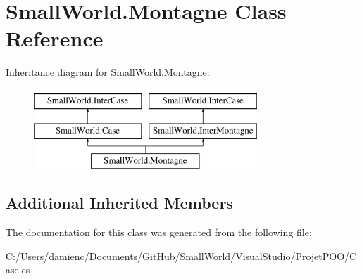 \hypertarget{class_small_world_1_1_montagne}{\section{Small\-World.\-Montagne Class Reference}
\label{class_small_world_1_1_montagne}
}
Inheritance diagram for Small\-World.\-Montagne\-:\begin{figure}[H]
\begin{center}
\leavevmode
\includegraphics[height=3.000000cm]{class_small_world_1_1_montagne}
\end{center}
\end{figure}
\subsection*{Additional Inherited Members}


The documentation for this class was generated from the following file\-:\begin{DoxyCompactItemize}
\item 
C\-:/\-Users/damienc/\-Documents/\-Git\-Hub/\-Small\-World/\-Visual\-Studio/\-Projet\-P\-O\-O/Case.\-cs\end{DoxyCompactItemize}

